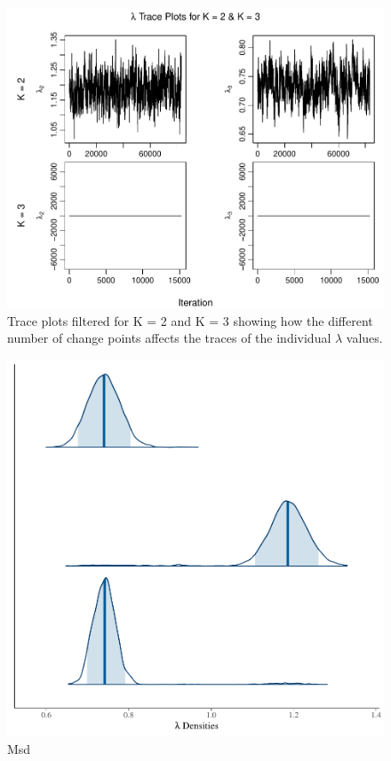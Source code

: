 \documentclass[11pt,a4paper]{article}
\numberwithin{equation}{section}
\begin{document}
\begin{figure}

{\centering \includegraphics[height=0.41\textheight]{thesis_draft_files/figure-latex/unnamed-chunk-6-1} 

}

\caption{Trace plots filtered for K = 2 and K = 3 showing how the different number of change points affects the traces of the individual $\lambda$ values.}\label{fig:unnamed-chunk-6}
\end{figure}

\begin{figure}
\centering
\includegraphics{thesis_draft_files/figure-latex/unnamed-chunk-7-1.pdf}
\caption{\label{fig:2c_dens} Msd}
\end{figure}
\end{document}
